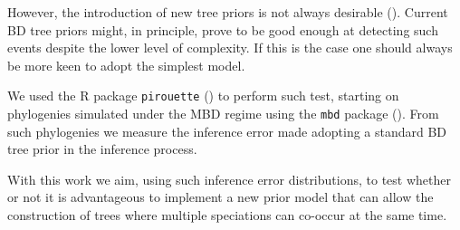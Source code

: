 However, the introduction of new tree priors is not always 
desirable (\citep{bilderbeek2019pirouette}). Current BD tree priors might, 
in principle, prove to be 
good enough at detecting such events despite the lower level of complexity. 
If this is the case one should always be more keen to adopt the simplest model.

We used the R package \verb;pirouette; (\citep{pirouette}) to perform such 
test, starting on phylogenies simulated under the MBD regime using 
the \verb;mbd; package (\citep{mbd}).
From such phylogenies we measure the inference error made adopting a 
standard BD tree prior in the inference process.

With this work we aim, using such inference error distributions, to test 
whether or not it is advantageous to implement a new prior model that can 
allow the construction of trees where multiple speciations can co-occur at 
the same time.
